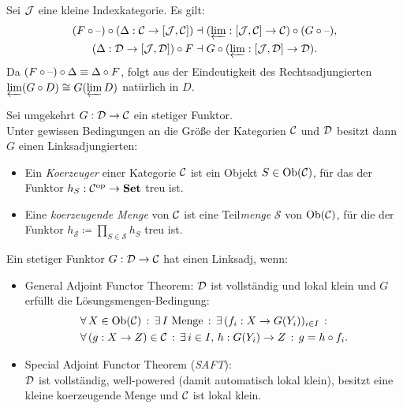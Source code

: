 \documentclass{cheat-sheet}
\begin{document}
\begin{beweis}[RAPL]
  Sei $\mathcal{J}$ eine kleine Indexkategorie.
  Es gilt:
  \begin{align*}
    (F \circ \text{--}) \circ (\Delta : \mathcal{C} \to [\mathcal{J}, \mathcal{C}]) & \dashv (\varprojlim : [\mathcal{J}, \mathcal{C}] \to \mathcal{C}) \circ (G \circ \text{--}), \\
    (\Delta : \mathcal{D} \to [\mathcal{J}, \mathcal{D}]) \circ F & \dashv G \circ (\varprojlim : [\mathcal{J}, \mathcal{D}] \to \mathcal{D}).
  \end{align*}
  Da $(F \circ \text{--}) \circ \Delta \equiv \Delta \circ F$, folgt aus der Eindeutigkeit des Rechtsadjungierten
  $\varprojlim (G \circ D) \cong G(\varprojlim D)$ natürlich in $D$.
\end{beweis}

\begin{bem}
  Sei umgekehrt $G : \mathcal{D} \to \mathcal{C}$ ein stetiger Funktor. \\
  Unter gewissen Bedingungen an die Größe der Kategorien $\mathcal{C}$ und $\mathcal{D}$ besitzt dann $G$ einen Linksadjungierten:
\end{bem}

\begin{defn}
  \begin{itemize}
    \item Ein \emph{Koerzeuger} einer Kategorie $\mathcal{C}$ ist ein Objekt $S \in \operatorname{Ob}(\mathcal{C})$, für das der Funktor $h_S : \mathcal{C}^{\mathrm{op}} \to \mathbf{Set}$ treu ist.
    \item Eine \emph{koerzeugende Menge} von $\mathcal{C}$ ist eine Teil\textit{menge} $\mathcal{S}$ von $\operatorname{Ob}(\mathcal{C})$, für die der Funktor $h_{\mathcal{S}} \coloneqq \prod_{S \in \mathcal{S}} h_S$ treu ist.
  \end{itemize}
\end{defn}

\begin{lem}
  Ein stetiger Funktor $G : \mathcal{D} \to \mathcal{C}$ hat einen Linksadj, wenn:
  \begin{itemize}
    \item General Adjoint Functor Theorem: $\mathcal{D}$ ist vollständig und lokal klein und $G$ erfüllt die Lösungsmengen-Bedingung:
    \begin{align*}
      & \forall \, {X \in \operatorname{Ob}(\mathcal{C})} \,:\, \exists \, {I \text{ Menge}} \,:\, \exists \, {(f_i : X \to G(Y_i))_{i \in I}} \,:\, \\
      & \forall \, {(g : X \to Z) \in \mathcal{C}} \,:\, \exists \, {i \in I, \, h : G(Y_i) \to Z} \,:\, g = h \circ f_i.
    \end{align*}
    \item Special Adjoint Functor Theorem (\emph{SAFT}): \\
    $\mathcal{D}$ ist vollständig, well-powered (damit automatisch lokal klein), besitzt eine kleine koerzeugende Menge und $\mathcal{C}$ ist lokal klein.
  \end{itemize}
\end{lem}
\end{document}
